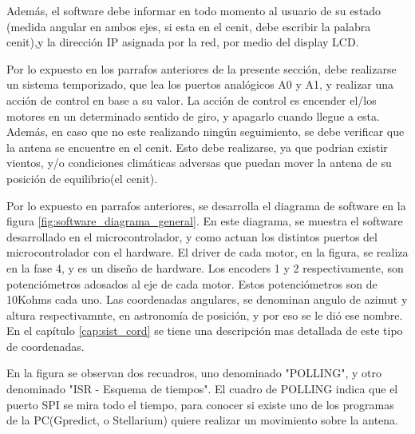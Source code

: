 Además, el software debe informar en todo momento al usuario de su estado (medida angular en ambos ejes, si esta en el cenit, debe escribir la palabra cenit),y la dirección IP asignada por la red, por medio del display LCD.  

Por lo expuesto en los parrafos anteriores de la presente sección, debe realizarse un sistema temporizado, que lea los puertos analógicos A0 y A1, y realizar una acción de control en base a su valor. La acción de control es encender el/los motores en un determinado sentido de giro, y apagarlo cuando llegue a esta. Además, en caso que no este realizando ningún seguimiento, se debe verificar que la antena se encuentre en el cenit. Esto debe realizarse, ya que podrian existir vientos, y/o condiciones climáticas adversas que puedan mover la antena de su posición de equilibrio(el cenit). 


Por lo expuesto en parrafos anteriores, se desarrolla el diagrama de software en la figura  \ref{fig:software_diagrama_general}. En este diagrama, se muestra el software desarrollado en el microcontrolador, y como actuan los distintos puertos del microcontrolador con el hardware. El driver de cada motor, en la figura, se realiza en la fase 4, y es un diseño de hardware. Los encoders 1 y 2 respectivamente, son potenciómetros adosados al eje de cada motor. Estos potenciómetros son de 10Kohms cada uno. Las coordenadas angulares, se denominan angulo de azimut y altura respectivamnte, en astronomía de posición, y por eso se le dió ese nombre. En el capítulo \ref{cap:sist_cord} se tiene una descripción mas detallada de este tipo de coordenadas. 

En la figura se observan dos recuadros, uno denominado "POLLING", y otro denominado "ISR - Esquema de tiempos". El cuadro de POLLING indica que el puerto SPI se mira todo el tiempo, para conocer si existe uno de los programas de la PC(Gpredict, o Stellarium) quiere realizar un movimiento sobre la antena. 


